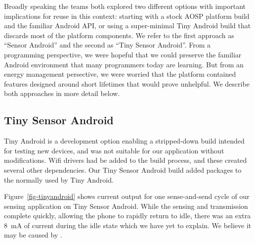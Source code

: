 Broadly speaking the teams both explored two different options with important
implications for reuse in this context: starting with a stock AOSP platform
build and the familiar Android API, or using a super-minimal Tiny Android
build that discards most of the platform components. We refer to the first
approach as ``Sensor Android'' and the second as ``Tiny Sensor Android''.
From a programming perspective, we were hopeful that we could preserve the
familiar Android environment that many programmers today are learning. But
from an energy management persective, we were worried that the platform
contained features designed around short lifetimes that would prove
unhelpful. We describe both approaches in more detail below.

\subsection{Tiny Sensor Android}
\label{subsec-tiny}

Tiny Android is a development option enabling a stripped-down build intended
for testing new devices, and was not suitable for our application without
modifications. Wifi drivers had be added to the build process, and these
created several other dependencies. Our Tiny Sensor Android build added
 packages to the  normally
used by Tiny Android.


Figure~\ref{fig-tinyandroid} shows current output for one sense-and-send
cycle of our sensing application on Tiny Sensor Android. While the sensing
and transmission complete quickly, allowing the phone to rapidly return to
idle, there was an extra 8~mA of current during the idle state which we have
yet to explain. We believe it may be caused by .

